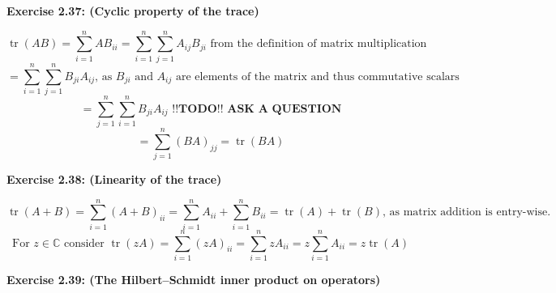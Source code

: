 \documentclass{article}
\begin{document}
\bigskip

\begin{framed}
    \noindent \textbf{Exercise 2.37: (Cyclic property of the trace)}
    
    \medskip

    $$
    \operatorname{tr}(AB) = \sum_{i=1}^{n}{AB}_{ii} = \sum_{i=1}^{n}\sum_{j=1}^{n}A_{ij}B_{ji} \text{ from the definition of matrix multiplication}
    $$
    $$
    = \sum_{i=1}^{n}\sum_{j=1}^{n}{B_{ji}A_{ij}} \text{, as } B_{ji} \text{ and } A_{ij} \text{ are elements of the matrix and thus commutative scalars}
    $$
    $$
    = \sum_{j=1}^{n}\sum_{i=1}^{n}{B_{ji}A_{ij}} \textbf{ !!TODO!! ASK A QUESTION}
    $$
    $$
    = \sum_{j=1}^{n}(BA)_{jj} = \operatorname{tr}(BA)
    $$
    
\end{framed}

\bigskip

\begin{framed}
    \noindent \textbf{Exercise 2.38: (Linearity of the trace)}
    
    \medskip

    $$
    \operatorname{tr}(A + B) = \sum_{i=1}^{n}{(A + B)_{ii}} = \sum_{i=1}^{n}A_{ii} + \sum_{i=1}^{n}B_{ii} = \operatorname{tr}(A) + \operatorname{tr}(B) \text{, as matrix addition is entry-wise}.
    $$
    $$
    \text{For } z \in \mathbb{C} \text{ consider } \operatorname{tr}(zA) = 
    \sum_{i=1}^{n}{(zA)_{ii}} = \sum_{i=1}^{n}{zA_{ii}} = z\sum_{i=1}^{n}{A_{ii}} = z\operatorname{tr}(A)
    $$
    
\end{framed}

\bigskip

\begin{framed}
    \noindent \textbf{Exercise 2.39: (The Hilbert–Schmidt inner product on operators)}
    
    \medskip
    
    
\end{framed}

\bigskip
\end{document}
